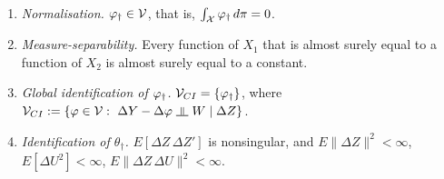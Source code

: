 %

\begin{assumption}[A1b: Identification]\label{ass:ident}~
\begin{enumerate}
\item[(i)] \emph{Normalisation.} $\varphi_{\dagger}\in\mathcal V$, that is, $\int_{\mathcal X}\varphi_{\dagger}\,d\pi=0$.
\item[(ii)] \emph{Measure-separability.} Every function of $X_1$ that is almost surely equal to a
function of $X_2$ is almost surely equal to a constant.
\item[(iii)] \emph{Global identification of $\varphi_{\dagger}$.} $\mathcal V_{CI}=\{\varphi_{\dagger}\}$, where
$\mathcal V_{CI}:=\{\varphi\in\mathcal V:\ \Delta Y-\Delta\varphi\upmodels W\mid\Delta Z\}$.
\item[(iv)] \emph{Identification of $\theta_\dagger$.} $E[\Delta Z\,\Delta Z']$ is nonsingular, and
$E\|\Delta Z\|^{2}<\infty$, $E[\Delta U^{2}]<\infty$, $E\|\Delta Z\,\Delta U\|^{2}<\infty$.
\end{enumerate}
\end{assumption}

